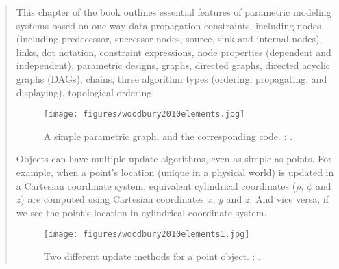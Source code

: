 		\begin{quote}
		\small
		This chapter of the book outlines essential features of parametric modeling 
		systems based on one-way data propagation constraints, including 
		nodes (including predecessor, successor nodes, source, sink and internal nodes), 
		links, dot notation, constraint expressions, node properties 
		(dependent and independent), parametric designs, graphs, directed graphs,
		directed acyclic graphs (DAGs), chains, three algorithm types (ordering,
		propagating, and displaying), topological ordering.
		
		\begin{figure}[htb]
			\centering
			\texttt{[image: figures/woodbury2010elements.jpg]}
			\caption{
			A simple parametric graph, and the corresponding code.  
			\citeauthor{woodbury2010elements}: 
			\cite{woodbury2010elements}.}
			\label{fig:woodbury2010elements}
		\end{figure}

		Objects can have multiple update algorithms, even as simple as points. 
		For example, when a point's location (unique in a physical world) 
		is updated in a Cartesian coordinate system,
		equivalent cylindrical coordinates ($\rho$, $\phi$ and $z$) are computed using
		Cartesian coordinates $x$, $y$ and $z$. And vice versa, if we see the point's
		location in cylindrical coordinate system.

		\begin{figure}[htb]
			\centering
			\texttt{[image: figures/woodbury2010elements1.jpg]}
			\caption{
			Two different update methods for a point object.
			\citeauthor{woodbury2010elements}: 
			\cite{woodbury2010elements}.}
			\label{fig:woodbury2010elements1}
		\end{figure}

						
		\end{quote}

